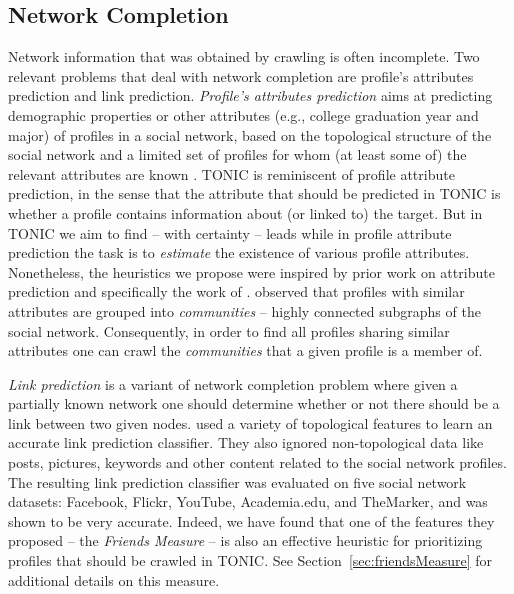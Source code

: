 \documentclass[journal]{IEEEtran}
\begin{document}
\subsection{Network Completion}
Network information that was obtained by crawling is often incomplete. 
Two relevant problems that deal with network completion are profile's attributes prediction and link prediction.  
{\em Profile's attributes prediction} aims at predicting demographic properties or other attributes (e.g., college graduation year and major) of profiles in a social network, based on the topological structure of the social network and a limited set of profiles for whom (at least some of) the relevant attributes are known \cite{fire2011linkPrediction,mislove2010youAreWho,altshuler2011incremental}. 
TONIC is reminiscent of profile attribute prediction, in the sense that the attribute that should be predicted in TONIC is whether a profile contains information about (or linked to) the target. But in TONIC we aim to find -- with certainty -- leads while in profile attribute prediction the task is to {\em estimate} the existence of various profile attributes. Nonetheless, the heuristics we propose were inspired by prior work on attribute prediction and specifically the work of 
.  observed that profiles with similar attributes are grouped into {\em communities} -- highly connected subgraphs of the social network. 
Consequently, in order to find all profiles sharing similar attributes one can crawl the {\em communities} that a given profile is a member of. 



{\em Link prediction} is a variant of network completion problem where given a partially known network one should determine whether or not there should be a link between two given nodes.  
 used
a variety of topological features to learn an accurate link prediction classifier. They also ignored non-topological data like posts, pictures, keywords and other content related to the social network profiles. The resulting link prediction classifier was evaluated 
on five social network datasets: Facebook, Flickr, YouTube, Academia.edu, and TheMarker, and was shown to be very accurate. 
Indeed, we have found that one of the features they proposed --  the \emph{Friends Measure} -- is also an effective heuristic for  prioritizing profiles that should be crawled in TONIC. See Section~\ref{sec:friendsMeasure} for additional details on this measure.  
\end{document}
